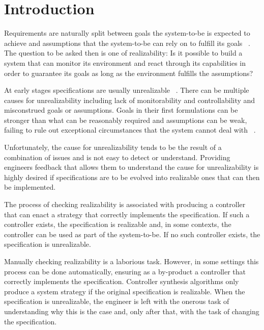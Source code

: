 \section{Introduction}\label{sec:introduction}


Requirements are naturally split between goals the system-to-be is expected to achieve and
assumptions that the system-to-be can rely on to fulfill its goals ~\cite{Jackson:1995,Letier:2002}. The question to be asked then is one of realizability: Is it possible to build a system that can monitor its environment and react through its capabilities in order to guarantee its goals as long as the environment fulfills the assumptions?

At early stages specifications are usually unrealizable ~\cite{Letier:2002}. There can be 
multiple causes for unrealizability including lack of monitorability and controllability 
and misconstrued goals or assumptions. Goals in their first formulations can  be 
stronger than what can be reasonably required and assumptions can be weak, failing to 
rule out exceptional circumstances that the system cannot deal with 
~\cite{vanLamsweerde:2000}. 

Unfortunately, the cause for unrealizability tends to be the result of a combination of issues and is not easy to detect or understand. Providing engineers feedback that allows them to understand the cause for unrealizability is highly desired if specifications are to be evolved into realizable ones that can then be implemented. 

The process of checking realizability is associated with producing a controller that can 
enact a strategy that correctly implements the specification. If such a controller exists, 
the specification is realizable and, in some contexts, the controller can be used as part of 
the system-to-be. If no such controller exists, the specification is unrealizable. 

Manually checking realizability is a laborious task. However, in some settings this 
process can be done automatically, ensuring as a by-product a controller  that correctly 
implements the specification.  Controller synthesis algorithms only produce a system 
strategy if the original specification is realizable. When the specification is unrealizable, 
the engineer is left with the onerous task of understanding why this is the case and, only 
after that, with the task of changing the specification.

